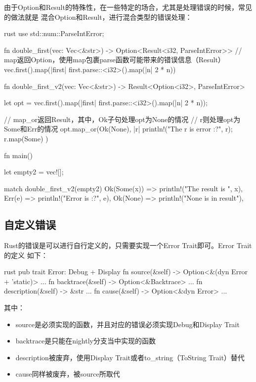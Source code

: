 由于Option和Result的特殊性，在一些特定的场合，尤其是处理错误的时候，常见的做法就是
混合Option和Result，进行混合类型的错误处理：
\begin{code-block}{rust}
use std::num::ParseIntError;

fn double_first(vec: Vec<&str>) -> Option<Result<i32, ParseIntError>> {
    // map返回Option，使用map包裹parse函数可能带来的错误信息（Result）
    vec.first().map(|first| first.parse::<i32>().map(|n| 2 * n))
}

fn double_first_v2(vec: Vec<&str>) -> Result<Option<i32>, ParseIntError> {
    let opt = vec.first().map(|first| first.parse::<i32>().map(|n| 2 * n));

    // map_or返回Result，其中，Ok子句处理opt为None的情况
    // r则处理opt为Some和Err的情况
    opt.map_or(Ok(None), |r| {
        println!("The r is error {:?}", r);
        r.map(Some)
    })
}

fn main() {
    let empty2 = vec![];

    match double_first_v2(empty2) {
        Ok(Some(x)) => println!("The result is {}", x),
        Err(e) => println!("Error is {:?}", e),
        Ok(None) => println!("None is in result"),
    }
}
\end{code-block}

\subsection{自定义错误}
Rust的错误是可以进行自行定义的，只需要实现一个Error Trait即可。Error Trait的定义
如下：
\begin{code-block}{rust}
pub trait Error: Debug + Display {
    fn source(&self) -> Option<&(dyn Error + 'static)> { ... }
    fn backtrace(&self) -> Option<&Backtrace> { ... }
    fn description(&self) -> &str { ... }
    fn cause(&self) -> Option<&dyn Error> { ... }
}
\end{code-block}
其中：
\begin{itemize}
  \item source是必须实现的函数，并且对应的错误必须实现Debug和Display Trait
  \item backtrace是只能在nightly分支当中实现的函数
  \item description被废弃，使用Display Trait或者to\_string（ToString Trait）替代
  \item cause同样被废弃，被source所取代
\end{itemize}

